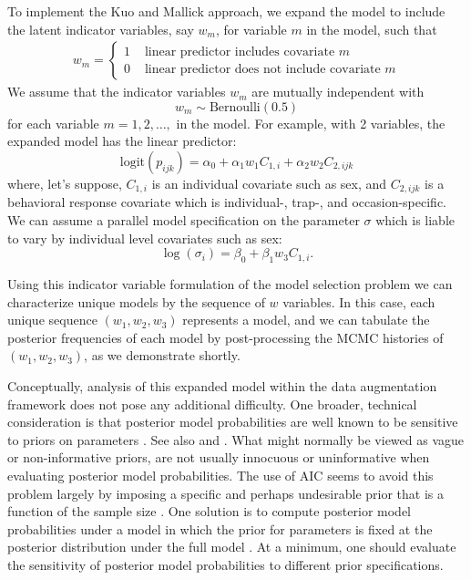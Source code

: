 {To implement the Kuo and Mallick approach, we expand the model to
include the latent indicator variables, say $w_{m}$, for variable $m$
in the model, such that
\begin{eqnarray*}
w_{m} = \left\{
\begin{array}{cl} 1 &  \mbox{ linear predictor includes  covariate $m$} \\
                  0 &  \mbox{ linear predictor does not
                                include covariate $m$}
 \end{array}
\right.
\end{eqnarray*}
We assume that the indicator variables $w_{m}$ are mutually
independent with
\[
w_m \sim \mbox{Bernoulli}(0.5)
\]
for each variable $m=1,2,\ldots,$ in the model. For example,
with 2 variables, the 
expanded model has the linear predictor:
\[
\mbox{logit}(p_{ijk}) = \alpha_{0} + \alpha_{1}w_{1} C_{1,i} + \alpha_{2}w_{2} C_{2,ijk}
\]
where, let's suppose, $C_{1,i}$ is an individual covariate such
as sex, and $C_{2,ijk}$ is a behavioral response covariate which is
individual-, trap-, and occasion-specific.  We can assume a parallel
model specification on the parameter $\sigma$ which is liable to vary
by individual level covariates such as sex:
\[
 \log(\sigma_{i}) = \beta_{0} + \beta_{1} w_{3} C_{1,i}.
\]

Using this indicator variable formulation of the model selection
problem we can characterize unique models by the sequence of $w$
variables. In this case, each unique sequence $(w_{1},w_{2},w_{3})$
represents a model, and we can tabulate the posterior frequencies of
each model by post-processing the MCMC histories of
$(w_{1},w_{2},w_{3})$, as we demonstrate shortly.

Conceptually, analysis of this expanded model within the data
augmentation framework does not pose any additional difficulty. One
broader, technical consideration is that posterior model probabilities
are well known to be sensitive to priors on parameters
\citep{aitkin:1991, link_barker:2006}. See also 
\citet[][Sec. 3.4.3]{royle_dorazio:2008} and
\citet[][Sec. 7.2.5]{link_barker:2010}.  What might normally be viewed
as vague or non-informative priors, are not usually innocuous or
uninformative when evaluating posterior model probabilities. The use
of AIC seems to avoid this problem largely by imposing a specific and
perhaps undesirable prior that is a function of the sample size
\citep{kadane_lazar:2004}. One solution is to compute posterior model
probabilities under a model in which the prior for parameters is fixed
at the posterior distribution under the full model
\citep{aitkin:1991}. At a minimum, one should evaluate the sensitivity
of posterior model probabilities to different prior specifications.


}
